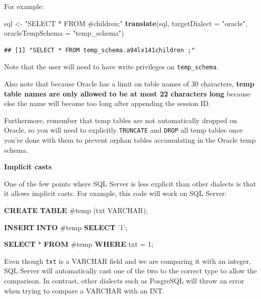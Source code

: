 \documentclass[11pt]{book}
\newenvironment{Shaded}{\begin{snugshade}}{\end{snugshade}}
\newcommand{\KeywordTok}[1]{\textcolor[rgb]{0.13,0.29,0.53}{\textbf{#1}}}
\newcommand{\DataTypeTok}[1]{\textcolor[rgb]{0.13,0.29,0.53}{#1}}
\newcommand{\DecValTok}[1]{\textcolor[rgb]{0.00,0.00,0.81}{#1}}
\newcommand{\StringTok}[1]{\textcolor[rgb]{0.31,0.60,0.02}{#1}}
\newcommand{\NormalTok}[1]{#1}
\begin{document}
For example:

\begin{Shaded}
\begin{Highlighting}[]
\NormalTok{sql <-}\StringTok{ "SELECT * FROM #children;"}
\KeywordTok{translate}\NormalTok{(sql, }\DataTypeTok{targetDialect =} \StringTok{"oracle"}\NormalTok{, }\DataTypeTok{oracleTempSchema =} \StringTok{"temp_schema"}\NormalTok{)}
\end{Highlighting}
\end{Shaded}

\begin{verbatim}
## [1] "SELECT * FROM temp_schema.a94lx141children ;"
\end{verbatim}

Note that the user will need to have write privileges on
\texttt{temp\_schema}.

Also note that because Oracle has a limit on table names of 30
characters, \textbf{temp table names are only allowed to be at most 22
characters long} because else the name will become too long after
appending the session ID.

Furthermore, remember that temp tables are not automatically dropped on
Oracle, so you will need to explicitly \texttt{TRUNCATE} and
\texttt{DROP} all temp tables once you're done with them to prevent
orphan tables accumulating in the Oracle temp schema.

\textbf{Implicit casts}

One of the few points where SQL Server is less explicit than other
dialects is that it allows implicit casts. For example, this code will
work on SQL Server:

\begin{Shaded}
\begin{Highlighting}[]
\KeywordTok{CREATE} \KeywordTok{TABLE}\NormalTok{ #temp (txt }\DataTypeTok{VARCHAR}\NormalTok{);}

\KeywordTok{INSERT} \KeywordTok{INTO}\NormalTok{ #temp}
\KeywordTok{SELECT} \StringTok{'1'}\NormalTok{;}

\KeywordTok{SELECT}\NormalTok{ * }\KeywordTok{FROM}\NormalTok{ #temp }\KeywordTok{WHERE}\NormalTok{ txt = }\DecValTok{1}\NormalTok{;}
\end{Highlighting}
\end{Shaded}

Even though \texttt{txt} is a VARCHAR field and we are comparing it with
an integer, SQL Server will automatically cast one of the two to the
correct type to allow the comparison. In contrast, other dialects such
as PosgreSQL will throw an error when trying to compare a VARCHAR with
an INT.
\end{document}
